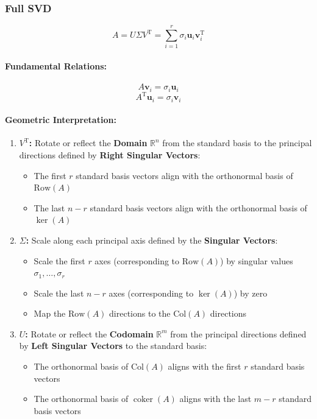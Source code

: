 \documentclass{article}
\begin{document}
\subsubsection{Full SVD}
\[
    A = U \Sigma V^{\mathrm{T}} = \sum_{i=1}^{r} \sigma_i \mathbf{u}_i \mathbf{v}_i^{\mathrm{T}}
\]

\paragraph{Fundamental Relations:}
\[
    A \mathbf{v}_i = \sigma_i \mathbf{u}_i
\]
\[
    A^{\mathrm{T}} \mathbf{u}_i = \sigma_i \mathbf{v}_i
\]

\paragraph{Geometric Interpretation:}
\begin{enumerate}
    \item \textbf{$V^{\mathrm{T}}$:} Rotate or reflect the \textbf{Domain} $\mathbb{R}^n$ from the standard basis to the principal directions defined by \textbf{Right Singular Vectors}:
    \begin{itemize}
        \item The first $r$ standard basis vectors align with the orthonormal basis of $\text{Row}(A)$
        \item The last $n-r$ standard basis vectors align with the orthonormal basis of $\ker(A)$
    \end{itemize}

    \item \textbf{$\Sigma$:} Scale along each principal axis defined by the \textbf{Singular Vectors}:
    \begin{itemize}
        \item Scale the first $r$ axes (corresponding to $\text{Row}(A)$) by singular values $\sigma_1, \ldots, \sigma_r$
        \item Scale the last $n-r$ axes (corresponding to $\ker(A)$) by zero
        \item Map the $\text{Row}(A)$ directions to the $\text{Col}(A)$ directions
    \end{itemize}

    \item \textbf{$U$:} Rotate or reflect the \textbf{Codomain} $\mathbb{R}^m$ from the principal directions defined by \textbf{Left Singular Vectors} to the standard basis:
    \begin{itemize}
        \item The orthonormal basis of $\text{Col}(A)$ aligns with the first $r$ standard basis vectors
        \item The orthonormal basis of $\operatorname{coker}(A)$ aligns with the last $m-r$ standard basis vectors
    \end{itemize}
\end{enumerate}
\end{document}
